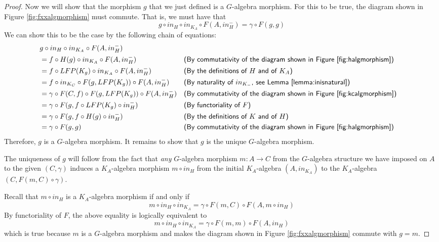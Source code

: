 \documentclass{msthesis}
\theoremstyle{definition}
\begin{document}
\begin{proof}
    Now we will show that the morphism $g$ that we just defined is a $G$-algebra morphism.  For this to be true, the diagram shown in Figure \ref{fig:fxxalgmorphism} must commute. That is, we must have that
    \[ g \circ in_H \circ in_{K_A} \circ F(A, in^-_H) = \gamma \circ F(g, g) \]
    We can show this to be the case by the following chain of equations:
    {\small \begin{align*}
        &g \circ in_H \circ in_{K_A} \circ F(A, in^-_H) \\
        &= f \circ H(g) \circ in_{K_A} \circ F(A, in^-_H) &&  \textsf{(By commutativity of the diagram shown in Figure 
        \ref{fig:halgmorphism})} \\
        &= f \circ LFP(K_g) \circ in_{K_A} \circ F(A, in^-_H) &&\textsf{(By the definitions of $H$ and of $K_A$)} \\
        &= f \circ in_{K_C} \circ F(g, LFP(K_g)) \circ F(A, in^-_H) &&\textsf{(By naturality of $in_{K_-}$, see Lemma \ref{lemma:inisnatural})} \\
        &= \gamma \circ F(C, f) \circ F(g, LFP(K_g)) \circ F(A, in^-_H) &&\textsf{(By commutativity of the diagram shown in Figure \ref{fig:kcalgmorphism})} \\
        &= \gamma \circ F(g, f \circ LFP(K_g) \circ in^-_H) &&\textsf{(By functoriality of $F$)}\\
        &= \gamma \circ F(g, f \circ H(g) \circ in^-_H) &&\textsf{(By the definitions of $K$ and of $H$)} \\
        &= \gamma \circ F(g, g) &&\textsf{(By commutativity of the diagram shown in Figure \ref{fig:halgmorphism})}
    \end{align*}}
    Therefore, $g$ is a $G$-algebra morphism.  It remains to show that $g$ is the unique $G$-algebra morphism.
    
    The uniqueness of $g$ will follow from the fact that \emph{any} $G$-algebra morphism $m : A \to C$ from the $G$-algebra structure we have imposed on $A$ to the given $(C, \gamma)$ induces a $K_A$-algebra morphism $m \circ in_H$ from the initial $K_A$-algebra $(A, in_{K_A})$ to the $K_A$-algebra $(C, F(m,C) \circ \gamma)$. 
    
    Recall that $m \circ in_H$ is a $K_A$-algebra morphism if and only if
    \[ m \circ in_H \circ in_{K_A} = \gamma \circ F(m, C) \circ F(A, m \circ in_H)\]
    By functoriality of $F$, the above equality is logically equivalent to
    \[ m \circ in_H \circ in_{K_A} = \gamma \circ F(m, m) \circ F(A, in_H) \]
    which is true because $m$ is a $G$-algebra morphism and makes the diagram shown in Figure \ref{fig:fxxalgmorphism} commute with $g = m$.


\end{proof}
\end{document}
